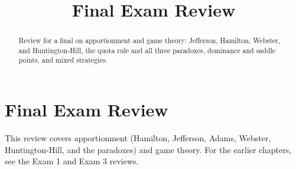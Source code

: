 \documentclass[12pt]{ximera}
\title{Final Exam Review}
\begin{document}
\begin{abstract}
Review for a final on apportionment and game theory: Jefferson, Hamilton, Webster, and Huntington-Hill, the quota rule and all three paradoxes, dominance and saddle points, and mixed strategies.
\end{abstract}
\maketitle

\section*{Final Exam Review}

This review covers apportionment (Hamilton, Jefferson, Adams, Webster, Huntington-Hill,
and the paradoxes) and game theory. For the earlier chapters, see the Exam 1 and Exam 3
reviews.
\end{document}
